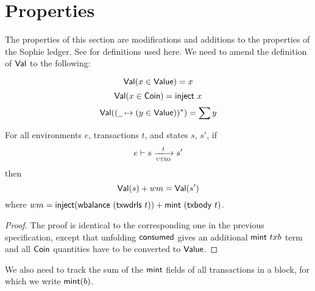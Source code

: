 \newcommand{\Val}{\fun{Val}}
\newcommand{\POV}[2]{\ensuremath{\mathsf{PresOfVal}(#1, \mathsf{#2})}}

\section{Properties}
\label{sec:properties}

The properties of this section are modifications and additions to the properties of the Sophie ledger. See \cite{sophie_spec} for definitions used here. We need to amend the definition of $\Val$ to the following:

\begin{equation*}
    \Val(x \in \Value) = x
\end{equation*}
\begin{equation*}
    \Val(x \in \Coin) = \fun{inject}~x
\end{equation*}
\begin{equation*}
    \Val((\wcard\mapsto (y \in \Value))^{*}) = \sum y
\end{equation*}

\begin{lemma}
  \label{lemma:utxo-pres-of-value}
  For all environments $e$, transactions $t$, and states $s$, $s'$, if
  \begin{equation*}
    e\vdash s\trans{utxo}{t}s'
  \end{equation*}
  then
  \begin{equation*}
    \Val(s) + wm = \Val(s')
  \end{equation*}
  where $wm = \mathsf{inject} (\mathsf{wbalance}~(\mathsf{txwdrls}~{t})) + \mathsf{mint}~(\mathsf{txbody}~{t})$.
\end{lemma}
\begin{proof}
  The proof is identical to the corresponding one in the previous
  specification, except that unfolding $\mathsf{consumed}$ gives an
  additional $\mathsf{mint}~{txb}$ term and all $\mathsf{Coin}$ quantities have
  to be converted to $\mathsf{Value}$.
\end{proof}

We also need to track the sum of the $\mathsf{mint}$ fields of all
transactions in a block, for which we write $\mathsf{mint}(b)$.

